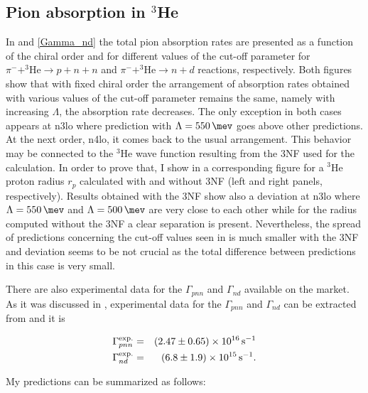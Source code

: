     \subsection{Pion absorption in $^3$He}
    
    In  and \ref{Gamma_nd} the total pion absorption rates are presented as a function
    of the chiral order and for different values of the cut-off parameter
    for $\pi^- + ^3\text{He} \rightarrow p + n + n$ 
    and $\pi^- + ^3\text{He} \rightarrow n + d$ reactions, respectively.
    Both figures show that with fixed chiral order the arrangement 
    of absorption rates obtained with various values of the cut-off parameter
    remains the same, namely with increasing $\Lambda$, the absorption rate decreases. The only exception in both cases 
    appears at \gls{n3lo} where prediction with $\Lambda = \SI{550}{\mev}$ goes above other predictions.
    At the next order, \gls{n4lo}, it comes back to the usual arrangement.
    This behavior may be connected to the $^3$He wave function resulting from the
    3NF used for the calculation.
    In order to prove that, I show in 
    a corresponding figure for a $^3$He proton radius $r_p$ calculated with 
    and without 3NF (left and right panels, respectively). Results obtained with the 3NF show
    also a deviation at \gls{n3lo} where $\Lambda=\SI{550}{\mev}$ and $\Lambda=\SI{500}{\mev}$ are 
    very close to each other while for the radius computed without the 3NF a clear separation is present.
    Nevertheless, the spread of predictions concerning
    the cut-off values seen in  is much smaller
    with the 3NF and deviation seems to be not crucial as the total difference
    between predictions in this case is very small.

    There are also experimental data for the $\Gamma_{pnn}$ and $\Gamma_{nd}$ available on the market.
    As it was discussed in \cite{golak_pion}, experimental data for the $\Gamma_{pnn}$ and $\Gamma_{nd}$ 
    can be extracted from \cite{SCHWANNER1984,McCarthy1975,truol1974} and it is

    \begin{eqnarray}\label{Gam_He_exp}
        \Gamma_{pnn} ^{\rm exp.} & =& (2.47\pm 0.65)\times 10^{16} \, {\rm s^{-1}}\\
        \Gamma_{nd}^{\rm exp.} & =  & (6.8\pm 1.9)\times 10^{15} \, {\rm s^{-1}}.
    \end{eqnarray}

    My predictions can be summarized as follows:

